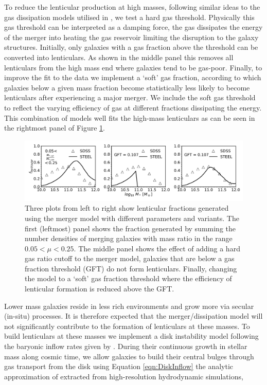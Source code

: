 To reduce the lenticular production at high masses, following similar ideas to the gas dissipation models utilised in \citet{Hopkins2009}, we test a hard gas threshold. Physically this gas threshold can be interpreted as a damping force, the gas dissipates the energy of the merger into heating the gas reservoir limiting the disruption to the galaxy structures. Initially, only galaxies with a gas fraction above the threshold can be converted into lenticulars. As shown in the middle panel this removes all lenticulars from the high mass end where galaxies tend to be gas-poor. 
Finally, to improve the fit to the data we implement a `soft' gas fraction, according to which galaxies below a given mass fraction become statistically less likely to become lenticulars after experiencing a major merger. We include the soft gas threshold to reflect the varying efficiency of gas at different fractions dissipating the energy. This combination of models well fits the high-mass lenticulars as can be seen in the rightmost panel of Figure \ref{fig:Lentcular_panels}.

\begin{figure}
  \includegraphics[width=\linewidth]{Figures/Chapter5/Lenticular_three.pdf}
    \caption{Three plots from left to right show lenticular fractions generated using the merger model with different parameters and variants. The first (leftmost) panel shows the fraction generated by summing the number densities of merging galaxies with mass ratio in the range $0.05 < \mu < 0.25$. The middle panel shows the effect of adding a hard gas ratio cutoff to the merger model, galaxies that are below a gas fraction threshold (GFT) do not form lenticulars. Finally, changing the model to a `soft' gas fraction threshold where the efficiency of lenticular formation is reduced above the GFT.}
    \label{fig:Lentcular_panels}
\end{figure}

Lower mass galaxies reside in less rich environments and grow more via secular (in-situ) processes. It is therefore expected that the merger/dissipation model will not significantly contribute to the formation of lenticulars at these masses. To build lenticulars at these masses we implement a disk instability model following the baryonic inflow rates given by \citet{Bournaud2011BLACKSTREAMS}. During their continuous growth in stellar mass along cosmic time, we allow galaxies to build their central bulges through gas transport from the disk using Equation \ref{eqn:DiskInflow} the analytic approximation of \citet{Bournaud2011BLACKSTREAMS} extracted from high-resolution hydrodynamic simulations, 


